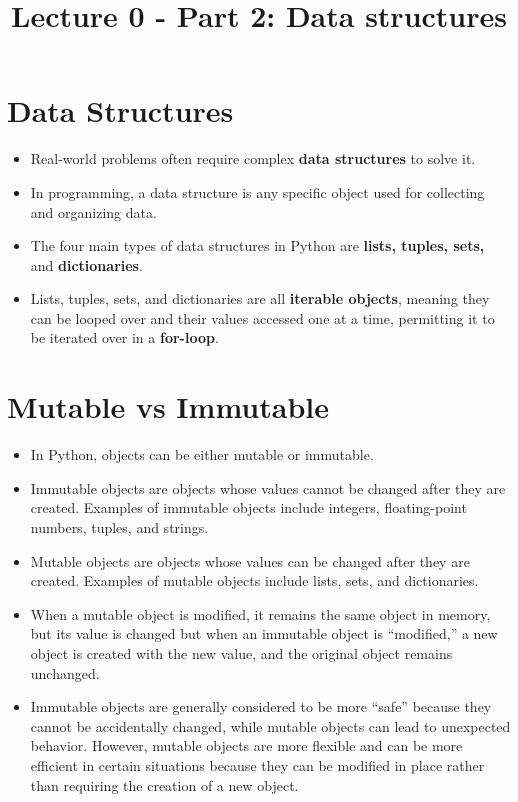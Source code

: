 \documentclass[11pt]{article}
\title{Lecture 0 - Part 2: Data structures}
\date{}
\providecommand{\tightlist}{%
      \setlength{\itemsep}{0pt}\setlength{\parskip}{0pt}}
\begin{document}
    
    \maketitle
    
    

    
    \hypertarget{data-structures}{%
\section{Data Structures}\label{data-structures}}

\begin{itemize}
\tightlist
\item
  Real-world problems often require complex \textbf{data structures} to
  solve it.
\item
  In programming, a data structure is any specific object used for
  collecting and organizing data.
\item
  The four main types of data structures in Python are \textbf{lists,
  tuples, sets,} and \textbf{dictionaries}.
\item
  Lists, tuples, sets, and dictionaries are all \textbf{iterable
  objects}, meaning they can be looped over and their values accessed
  one at a time, permitting it to be iterated over in a
  \textbf{for-loop}.
\end{itemize}

\hypertarget{mutable-vs-immutable}{%
\section{Mutable vs Immutable}\label{mutable-vs-immutable}}

\begin{itemize}
\tightlist
\item
  In Python, objects can be either mutable or immutable.
\item
  Immutable objects are objects whose values cannot be changed after
  they are created. Examples of immutable objects include integers,
  floating-point numbers, tuples, and strings.
\item
  Mutable objects are objects whose values can be changed after they are
  created. Examples of mutable objects include lists, sets, and
  dictionaries.
\item
  When a mutable object is modified, it remains the same object in
  memory, but its value is changed but when an immutable object is
  ``modified,'' a new object is created with the new value, and the
  original object remains unchanged.
\item
  Immutable objects are generally considered to be more ``safe'' because
  they cannot be accidentally changed, while mutable objects can lead to
  unexpected behavior. However, mutable objects are more flexible and
  can be more efficient in certain situations because they can be
  modified in place rather than requiring the creation of a new object.
\end{itemize}
\end{document}
